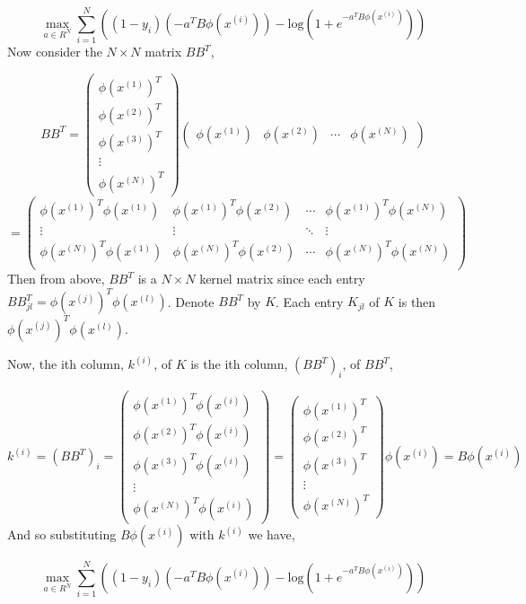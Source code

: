 \documentclass[]{article}
\begin{document}
\[\max_{a \in R^N} \displaystyle \sum_{i=1}^{N}((1-y_i)(-a^TB\phi(x^{(i)}))-\text{log}(1+e^{-a^TB\phi(x^{(i)})}))\]
Now consider the \(N \times N\) matrix \(BB^T\),

\[ 
B B^T = 
\begin{pmatrix}
\phi(x^{(1)})^T \\
\phi(x^{(2)})^T  \\
\phi(x^{(3)})^T \\
\vdots    \\
\phi(x^{(N)})^T
\end{pmatrix}
\begin{pmatrix}
\phi(x^{(1)}) & \phi(x^{(2)}) & \cdots & \phi(x^{(N)})
\end{pmatrix} 
\] \[
=\begin{pmatrix}
\phi(x^{(1)})^T\phi(x^{(1)}) & \phi(x^{(1)})^T\phi(x^{(2)}) & \cdots & \phi(x^{(1)})^T\phi(x^{(N)}) \\
\vdots  & \vdots & \ddots & \vdots  \\
\phi(x^{(N)})^T\phi(x^{(1)}) & \phi(x^{(N)})^T\phi(x^{(2)}) & \cdots & \phi(x^{(N)})^T\phi(x^{(N)}) \\
\end{pmatrix}
\] Then from above, \(BB^T\) is a \(N \times N\) kernel matrix since
each entry \(BB^T_{jl}=\phi(x^{(j)})^T\phi(x^{(l)})\). Denote \(BB^T\)
by \(K\). Each entry \(K_{jl}\) of \(K\) is then
\(\phi(x^{(j)})^T\phi(x^{(l)}).\)

Now, the ith column, \(k^{(i)}\), of \(K\) is the ith column,
\((BB^T)_i\), of \(BB^T\),

\[
k^{(i)}=(BB^T)_i=
\begin{pmatrix}
\phi(x^{(1)})^T\phi(x^{(i)}) \\
\phi(x^{(2)})^T\phi(x^{(i)})  \\
\phi(x^{(3)})^T\phi(x^{(i)}) \\
\vdots    \\
\phi(x^{(N)})^T\phi(x^{(i)})
\end{pmatrix}
= 
\begin{pmatrix}
\phi(x^{(1)})^T \\
\phi(x^{(2)})^T  \\
\phi(x^{(3)})^T \\
\vdots    \\
\phi(x^{(N)})^T
\end{pmatrix}
\phi(x^{(i)})=B\phi(x^{(i)})
\] And so substituting \(B\phi(x^{(i)})\) with \(k^{(i)}\) we have,

\[\max_{a \in R^N} \displaystyle \sum_{i=1}^{N}((1-y_i)(-a^TB\phi(x^{(i)}))-\text{log}(1+e^{-a^TB\phi(x^{(i)})}))\]
\end{document}
